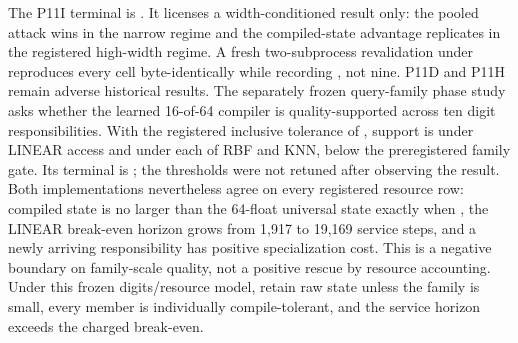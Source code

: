 {}The P11I terminal is . It licenses a width-conditioned result only: the pooled attack wins in the narrow regime and the compiled-state advantage replicates in the registered high-width regime. A fresh two-subprocess revalidation under  reproduces every cell byte-identically while recording , not nine. P11D and P11H remain adverse historical results.\markdownRendererInterblockSeparator
{}
\markdownRendererSectionEnd \markdownRendererSectionBegin
{}\markdownRendererInterblockSeparator
{}The separately frozen query-family phase study asks whether the learned 16-of-64 compiler is quality-supported across ten digit responsibilities. With the registered inclusive tolerance of , support is  under LINEAR access and  under each of RBF and KNN, below the preregistered  family gate. Its terminal is ; the thresholds were not retuned after observing the result.\markdownRendererInterblockSeparator
{}Both implementations nevertheless agree on every registered resource row: compiled state is no larger than the 64-float universal state exactly when , the LINEAR break-even horizon grows from 1,917 to 19,169 service steps, and a newly arriving responsibility has positive specialization cost. This is a negative boundary on family-scale quality, not a positive rescue by resource accounting. Under this frozen digits/resource model, retain raw state unless the family is small, every member is individually compile-tolerant, and the service horizon exceeds the charged break-even.
\markdownRendererSectionEnd 
\markdownRendererSectionEnd \markdownRendererDocumentEnd